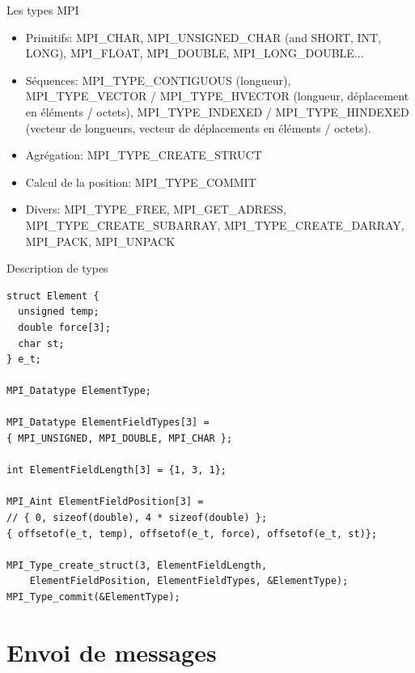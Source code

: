\documentclass[10pt]{beamer}
\begin{document}
\begin{frame}{Les types MPI}

  \begin{itemize}
    \item Primitifs: MPI\_CHAR, MPI\_UNSIGNED\_CHAR (and SHORT, INT, LONG), MPI\_FLOAT, MPI\_DOUBLE, MPI\_LONG\_DOUBLE...

    \item Séquences: MPI\_TYPE\_CONTIGUOUS (longueur), MPI\_TYPE\_VECTOR / MPI\_TYPE\_HVECTOR (longueur, déplacement en éléments / octets), MPI\_TYPE\_INDEXED / MPI\_TYPE\_HINDEXED (vecteur de longueurs, vecteur de déplacements en éléments / octets).

    \item Agrégation: MPI\_TYPE\_CREATE\_STRUCT

    \item Calcul de la position: MPI\_TYPE\_COMMIT

    \item Divers: MPI\_TYPE\_FREE, MPI\_GET\_ADRESS, MPI\_TYPE\_CREATE\_SUBARRAY, MPI\_TYPE\_CREATE\_DARRAY, MPI\_PACK, MPI\_UNPACK
  \end{itemize}
\end{frame}

\begin{frame}[fragile]{Description de types}

  \scriptsize
  \begin{verbatim}
struct Element {
  unsigned temp;
  double force[3];
  char st;
} e_t;

MPI_Datatype ElementType;

MPI_Datatype ElementFieldTypes[3] = 
{ MPI_UNSIGNED, MPI_DOUBLE, MPI_CHAR };

int ElementFieldLength[3] = {1, 3, 1};

MPI_Aint ElementFieldPosition[3] = 
// { 0, sizeof(double), 4 * sizeof(double) };
{ offsetof(e_t, temp), offsetof(e_t, force), offsetof(e_t, st)};

MPI_Type_create_struct(3, ElementFieldLength,
    ElementFieldPosition, ElementFieldTypes, &ElementType);
MPI_Type_commit(&ElementType);
  \end{verbatim}
\end{frame}

\section{Envoi de messages}
\end{document}

